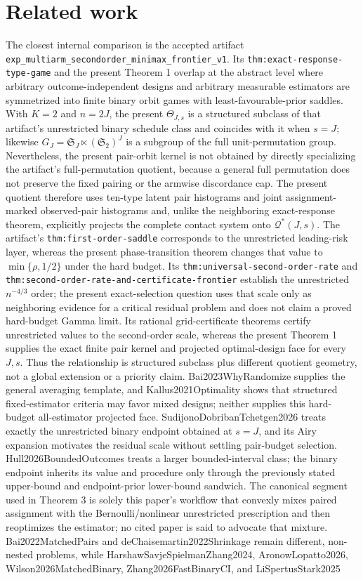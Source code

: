 \documentclass{article}
\begin{document}
\section{Related work}

The closest internal comparison is the accepted artifact \texttt{exp\_multiarm\_secondorder\_minimax\_frontier\_v1}. Its \texttt{thm:exact-response-type-game} and the present Theorem 1 overlap at the abstract level where arbitrary outcome-independent designs and arbitrary measurable estimators are symmetrized into finite binary orbit games with least-favourable-prior saddles. With \(K=2\) and \(n=2J\), the present \(\Theta_{J,s}\) is a structured subclass of that artifact's unrestricted binary schedule class and coincides with it when \(s=J\); likewise \(G_J=\mathfrak S_J\ltimes(\mathfrak S_2)^J\) is a subgroup of the full unit-permutation group. Nevertheless, the present pair-orbit kernel is not obtained by directly specializing the artifact's full-permutation quotient, because a general full permutation does not preserve the fixed pairing or the armwise discordance cap. The present quotient therefore uses ten-type latent pair histograms and joint assignment-marked observed-pair histograms and, unlike the neighboring exact-response theorem, explicitly projects the complete contact system onto \(\mathcal Q^*(J,s)\). The artifact's \texttt{thm:first-order-saddle} corresponds to the unrestricted leading-risk layer, whereas the present phase-transition theorem changes that value to \(\min\{\rho,1/2\}\) under the hard budget. Its \texttt{thm:universal-second-order-rate} and \texttt{thm:second-order-rate-and-certificate-frontier} establish the unrestricted \(n^{-4/3}\) order; the present exact-selection question uses that scale only as neighboring evidence for a critical residual problem and does not claim a proved hard-budget Gamma limit. Its rational grid-certificate theorems certify unrestricted values to the second-order scale, whereas the present Theorem 1 supplies the exact finite pair kernel and projected optimal-design face for every \(J,s\). Thus the relationship is structured subclass plus different quotient geometry, not a global extension or a priority claim. Bai2023WhyRandomize supplies the general averaging template, and Kallus2021Optimality shows that structured fixed-estimator criteria may favor mixed designs; neither supplies this hard-budget all-estimator projected face. SudijonoDobribanTchetgen2026 treats exactly the unrestricted binary endpoint obtained at \(s=J\), and its Airy expansion motivates the residual scale without settling pair-budget selection. Hull2026BoundedOutcomes treats a larger bounded-interval class; the binary endpoint inherits its value and procedure only through the previously stated upper-bound and endpoint-prior lower-bound sandwich. The canonical segment used in Theorem 3 is solely this paper's workflow that convexly mixes paired assignment with the Bernoulli/nonlinear unrestricted prescription and then reoptimizes the estimator; no cited paper is said to advocate that mixture. Bai2022MatchedPairs and deChaisemartin2022Shrinkage remain different, non-nested problems, while HarshawSavjeSpielmanZhang2024, AronowLopatto2026, Wilson2026MatchedBinary, Zhang2026FastBinaryCI, and LiSpertusStark2025 
\end{document}
